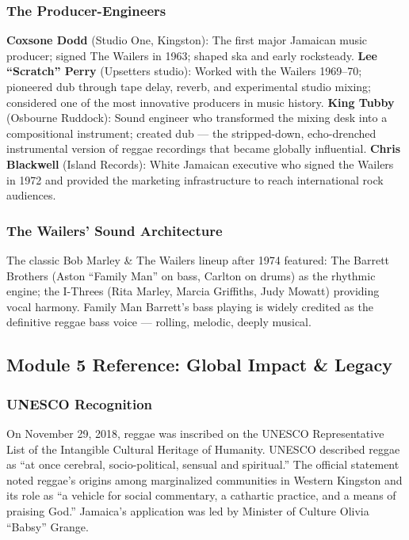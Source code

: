 \documentclass[11pt,letterpaper]{article}
\begin{document}
\subsubsection{The Producer-Engineers}

\textbf{Coxsone Dodd} (Studio One, Kingston): The first major Jamaican music producer; signed The Wailers in 1963; shaped ska and early rocksteady. \textbf{Lee ``Scratch'' Perry} (Upsetters studio): Worked with the Wailers 1969--70; pioneered dub through tape delay, reverb, and experimental studio mixing; considered one of the most innovative producers in music history. \textbf{King Tubby} (Osbourne Ruddock): Sound engineer who transformed the mixing desk into a compositional instrument; created dub --- the stripped-down, echo-drenched instrumental version of reggae recordings that became globally influential. \textbf{Chris Blackwell} (Island Records): White Jamaican executive who signed the Wailers in 1972 and provided the marketing infrastructure to reach international rock audiences.

\subsubsection{The Wailers' Sound Architecture}

The classic Bob Marley \& The Wailers lineup after 1974 featured: The Barrett Brothers (Aston ``Family Man'' on bass, Carlton on drums) as the rhythmic engine; the I-Threes (Rita Marley, Marcia Griffiths, Judy Mowatt) providing vocal harmony. Family Man Barrett's bass playing is widely credited as the definitive reggae bass voice --- rolling, melodic, deeply musical.

\subsection{Module 5 Reference: Global Impact \& Legacy}

\subsubsection{UNESCO Recognition}

On November 29, 2018, reggae was inscribed on the UNESCO Representative List of the Intangible Cultural Heritage of Humanity. UNESCO described reggae as ``at once cerebral, socio-political, sensual and spiritual.'' The official statement noted reggae's origins among marginalized communities in Western Kingston and its role as ``a vehicle for social commentary, a cathartic practice, and a means of praising God.'' Jamaica's application was led by Minister of Culture Olivia ``Babsy'' Grange.
\end{document}
